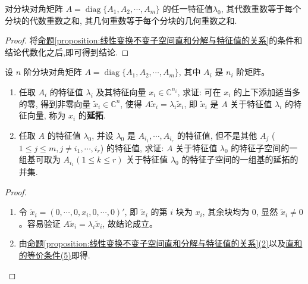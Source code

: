 \documentclass[../../main.tex]{subfiles}
\begin{document}
\begin{corollary}\label{corollary:分块准对角矩阵的任一特征值的代数重数与几何重数}
对分块对角矩阵 $A = \operatorname{diag}\{A_1, A_2, \cdots, A_m\}$ 的任一特征值$\lambda_0$, 其代数重数等于每个分块的代数重数之和, 其几何重数等于每个分块的几何重数之和.
\end{corollary}
\begin{proof}
将\hyperref[proposition:线性变换不变子空间直和分解与特征值的关系]{命题\ref{proposition:线性变换不变子空间直和分解与特征值的关系}}的条件和结论代数化之后,即可得到结论.

\end{proof}

\begin{proposition}[特征向量的延拓]\label{proposition:特征向量的延拓}
设 $n$ 阶分块对角矩阵 $A = \operatorname{diag}\{A_1, A_2, \cdots, A_m\}$, 其中 $A_i$ 是 $n_i$ 阶矩阵。
\begin{enumerate}[(1)]
\item 任取 $A_i$ 的特征值 $\lambda_i$ 及其特征向量 $x_i \in \mathbb{C}^{n_i}$, 求证: 可在 $x_i$ 的上下添加适当多的零, 得到非零向量 $\tilde{x}_i \in \mathbb{C}^n$, 使得 $A \tilde{x}_i = \lambda_i \tilde{x}_i$, 即 $\tilde{x}_i$ 是 $A$ 关于特征值 $\lambda_i$ 的特征向量, 称为 $x_i$ 的\textbf{延拓}.

\item 任取 $A$ 的特征值 $\lambda_0$, 并设 $\lambda_0$ 是 $A_{i_1}, \cdots, A_{i_r}$ 的特征值, 但不是其他 $A_j$ ($1 \leqslant  j \leqslant  m, j \neq i_1, \cdots, i_r$) 的特征值, 求证: $A$ 关于特征值 $\lambda_0$ 的特征子空间的一组基可取为 $A_{i_1} (1 \leqslant  k \leqslant  r)$ 关于特征值 $\lambda_0$ 的特征子空间的一组基的延拓的并集.
\end{enumerate} 
\end{proposition}
\begin{proof}
\begin{enumerate}[(1)]
\item 令 $\tilde{x}_i = (0, \cdots, 0, x_i, 0, \cdots, 0)'$, 即 $\tilde{x}_i$ 的第 $i$ 块为 $x_i$, 其余块均为 $0$, 显然 $\tilde{x}_i \neq 0$。容易验证 $A \tilde{x}_i = \lambda_i \tilde{x}_i$, 故结论成立。

\item 由\hyperref[proposition:线性变换不变子空间直和分解与特征值的关系]{命题\ref{proposition:线性变换不变子空间直和分解与特征值的关系}(2)}以及\hyperref[theorem:直和的等价条件]{直和的等价条件(5)}即得.
\end{enumerate}

\end{proof}
\end{document}
